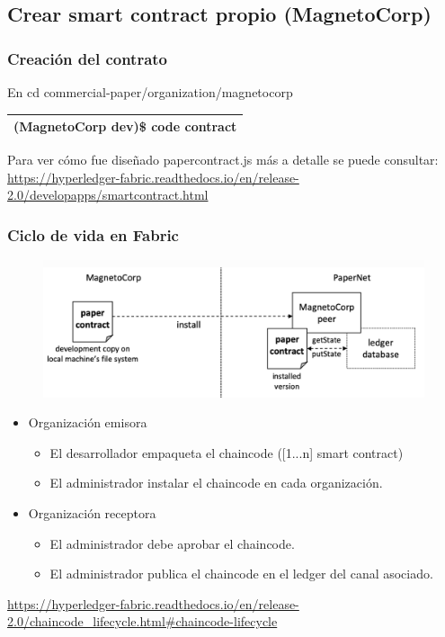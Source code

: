 \documentclass{beamer}
\begin{document}
	\subsection{Crear smart contract propio (MagnetoCorp)}
	
	\begin{frame}
		\frametitle{Creación del contrato}
		En cd commercial-paper/organization/magnetocorp\\
		\begin{center}
			\begin{tabulary}{\linewidth}{L}
				\hline
				(MagnetoCorp dev)\$ code contract \\
				\hline
			\end{tabulary} 
		\end{center}
		Para ver cómo fue diseñado papercontract.js más a detalle se puede consultar:  \small{\url{https://hyperledger-fabric.readthedocs.io/en/release-2.0/developapps/smartcontract.html}}
	\end{frame}

	\begin{frame}
		\frametitle{Ciclo de vida en Fabric}
		\begin{figure}[h]
			\includegraphics[scale=.4]{papernet_04}
			\centering
		\end{figure}
		\begin{itemize}
			\item Organización emisora
			\begin{itemize}
				\item El desarrollador empaqueta el chaincode ([1...n] smart contract)
				\item El administrador instalar el chaincode en cada organización.
			\end{itemize}
			\item Organización receptora
			\begin{itemize}
				\item El administrador debe aprobar el chaincode.
				\item El administrador publica el chaincode en el ledger del canal asociado.
			\end{itemize}
		\end{itemize}
		{\tiny \url{https://hyperledger-fabric.readthedocs.io/en/release-2.0/chaincode\_lifecycle.html\#chaincode-lifecycle} }
	\end{frame}
	
\end{document}
